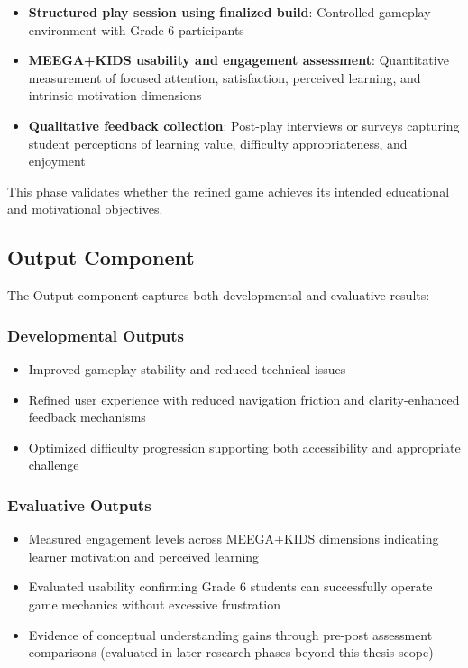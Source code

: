 \begin{itemize}
    \item \textbf{Structured play session using finalized build}: Controlled gameplay environment with Grade 6 participants
    \item \textbf{MEEGA+KIDS usability and engagement assessment}: Quantitative measurement of focused attention, satisfaction, perceived learning, and intrinsic motivation dimensions \cite{vonWangenheim2020}
    \item \textbf{Qualitative feedback collection}: Post-play interviews or surveys capturing student perceptions of learning value, difficulty appropriateness, and enjoyment
\end{itemize}

This phase validates whether the refined game achieves its intended educational and motivational objectives.

\subsection{Output Component}

The Output component captures both developmental and evaluative results:

\subsubsection{Developmental Outputs}
\begin{itemize}
    \item Improved gameplay stability and reduced technical issues
    \item Refined user experience with reduced navigation friction and clarity-enhanced feedback mechanisms
    \item Optimized difficulty progression supporting both accessibility and appropriate challenge
\end{itemize}

\subsubsection{Evaluative Outputs}
\begin{itemize}
    \item Measured engagement levels across MEEGA+KIDS dimensions indicating learner motivation and perceived learning
    \item Evaluated usability confirming Grade 6 students can successfully operate game mechanics without excessive frustration
    \item Evidence of conceptual understanding gains through pre-post assessment comparisons (evaluated in later research phases beyond this thesis scope)
\end{itemize}


